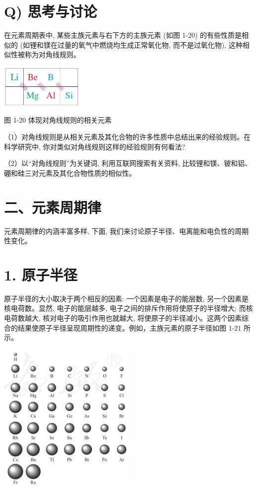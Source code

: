 \documentclass[10pt]{article}
\begin{document}
\section*{Q) 思考与讨论}

在元素周期表中, 某些主族元素与右下方的主族元素 (如图 1-20) 的有些性质是相似的 (如锂和镁在过量的氧气中燃烧均生成正常氧化物, 而不是过氧化物), 这种相似性被称为对角线规则。

\begin{center}
\includegraphics[max width=0.3\textwidth]{images/0190e026-5a11-7df7-bd27-54d09026ba7a_25_449617.jpg}
\end{center}

图 1-20 体现对角线规则的相关元素

（1）对角线规则是从相关元素及其化合物的许多性质中总结出来的经验规则。在科学研究中, 你对类似对角线规则这样的经验规则有何看法?

（2）以“对角线规则”为关键词, 利用互联网搜索有关资料, 比较锂和镁、铍和铝、硼和硅三对元素及其化合物性质的相似性。

\section*{二、元素周期律}

元素周期律的内涵丰富多样, 下面, 我们来讨论原子半径、电离能和电负性的周期性变化。

\section*{1. 原子半径}

原子半径的大小取决于两个相反的因素: 一个因素是电子的能层数, 另一个因素是核电荷数。显然, 电子的能层越多, 电子之间的排斥作用将使原子的半径增大; 而核电荷数越大, 核对电子的吸引作用也就越大, 将使原子的半径减小。这两个因素综合的结果使原子半径呈现周期性的递变。例如，主族元素的原子半径如图 1-21 所示。

\begin{center}
\includegraphics[max width=0.5\textwidth]{images/0190e026-5a11-7df7-bd27-54d09026ba7a_25_688678.jpg}
\end{center}
\end{document}
